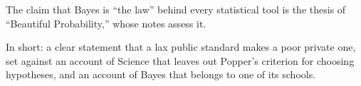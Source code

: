 \begin{afterword}
The claim that Bayes is ``the law'' behind every statistical tool is the thesis of ``Beautiful Probability,'' whose notes assess it.

In short: a clear statement that a lax public standard makes a poor private one, set against an account of Science that leaves out Popper's criterion for choosing hypotheses, and an account of Bayes that belongs to one of its schools.
\end{afterword}
